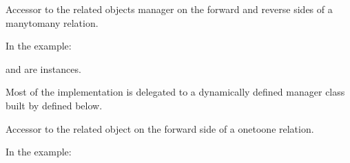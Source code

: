 \documentclass[letterpaper,10pt,french]{sphinxmanual}
\begin{document}
\begin{fulllineitems}

\begin{fulllineitems}
\label{\detokenize{main/model:main.models.Etudiant.tuteurs}}
\pysigstartsignatures
{}
\pysigstopsignatures
\sphinxAtStartPar
Accessor to the related objects manager on the forward and reverse sides of
a many\sphinxhyphen{}to\sphinxhyphen{}many relation.

\sphinxAtStartPar
In the example:

\begin{sphinxVerbatim}[commandchars=\\\{\}]
 
       
\end{sphinxVerbatim}

\sphinxAtStartPar
{} and  are 
instances.

\sphinxAtStartPar
Most of the implementation is delegated to a dynamically defined manager
class built by  defined below.

\end{fulllineitems}


\begin{fulllineitems}
\label{\detokenize{main/model:main.models.Etudiant.user}}
\pysigstartsignatures
{}
\pysigstopsignatures
\sphinxAtStartPar
Accessor to the related object on the forward side of a one\sphinxhyphen{}to\sphinxhyphen{}one relation.

\sphinxAtStartPar
In the example:

\begin{sphinxVerbatim}[commandchars=\\\{\}]
 
       
\end{sphinxVerbatim}


\end{fulllineitems}
\end{fulllineitems}
\end{document}
